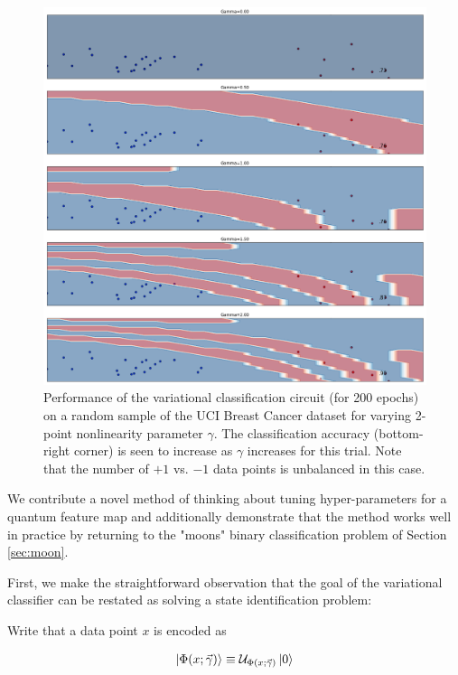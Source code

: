 \documentclass[main.tex]{subfiles}
\begin{document}
\begin{figure}[H]
\label{fig:breast_cancer_gammas}
\centering
\includegraphics[width=\textwidth]{images/breast_cancer_gammas}	
\caption{Performance of the variational classification circuit (for 200 epochs) on a random sample of the UCI Breast Cancer dataset for varying 2-point nonlinearity parameter $\gamma$. The classification accuracy (bottom-right corner) is seen to increase as $\gamma$ increases for this trial. Note that the number of $+1$ vs. $-1$ data points is unbalanced in this case.}
\end{figure}

We contribute a novel method of thinking about tuning hyper-parameters for a quantum feature map and additionally demonstrate that the method works well in practice by returning to the "moons" binary classification problem of Section \ref{sec:moon}.

First, we make the straightforward observation that the goal of the variational classifier can be restated as solving a state identification problem:

Write that a data point $x$ is encoded as

\begin{align*}
\ket{\Phi(x; \vec{\gamma})} \equiv \mathcal{U}_{\Phi(x; \vec{\gamma})}\ket{0}
\end{align*}
\end{document}
